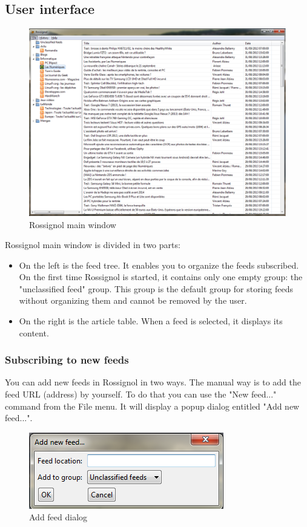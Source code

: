 \documentclass[11pt]{article} %
\begin{document}
\subsection{User interface}

\begin{figure}[h]
\includegraphics[width=15cm]{img/screen_rossignol.png}
\caption{Rossignol main window}
\end{figure}

Rossignol main window is divided in two parts:
\begin{itemize}
\item On the left is the feed tree. It enables you to organize the feeds 
subscribed. On the first time Rossignol is started, it contains only one empty 
group: the "unclassified feed" group. This group is the default group for 
storing feeds without organizing them and cannot be removed by the user.
\item On the right is the article table. When a feed is selected, it displays 
its content. 
\end{itemize}

\subsubsection{Subscribing to new feeds}

You can add new feeds in Rossignol in two ways. The manual way is to add the 
feed URL (address) by yourself. To do that you can use the "New feed..." 
command from the File menu. It will display a popup dialog entitled 
"Add new feed...".

\begin{figure}[h]
\centering
\includegraphics{img/add_feed_dialog.png}
\caption{Add feed dialog}
\end{figure}
\end{document}
